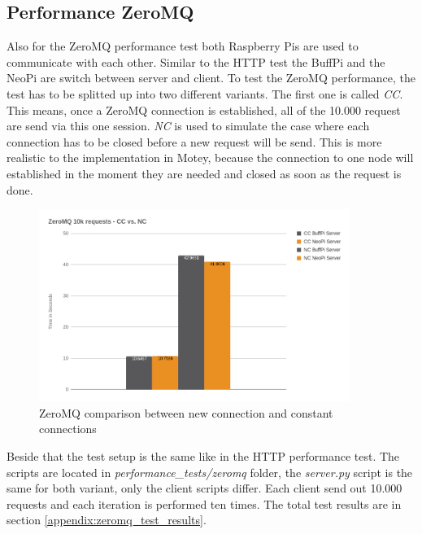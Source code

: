 \subsection{Performance ZeroMQ}
Also for the ZeroMQ performance test both Raspberry Pis are used to communicate with each other.
Similar to the \ac{HTTP} test the BuffPi and the NeoPi are switch between server and client.
To test the ZeroMQ performance, the test has to be splitted up into two different variants.
The first one is called \textit{\ac{CC}}.
This means, once a ZeroMQ connection is established, all of the 10.000 request are send via this one session.
\textit{\ac{NC}} is used to simulate the case where each connection has to be closed before a new request will be send.
This is more realistic to the implementation in Motey, because the connection to one node will established in the moment they are needed and closed as soon as the request is done.

\begin{figure}[H]
    \centering
    \includegraphics[width=0.9\textwidth]{resources/images/performance_zeromq_cc_vs_nc.png}
    \caption[ZeroMQ comparison between new connection and constant connections]{ZeroMQ comparison between new connection and constant connections}
    \label{fig:performance_zeromq_cc_vs_nc}
\end{figure}

Beside that the test setup is the same like in the \ac{HTTP} performance test.
The scripts are located in \textit{performance\_tests/zeromq} folder, the \textit{server.py} script is the same for both variant, only the client scripts differ.
Each client send out 10.000 requests and each iteration is performed ten times.
The total test results are in section \ref{appendix:zeromq_test_results}.\newline


